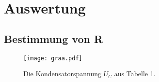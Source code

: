 \section{Auswertung}
\label{sec:Auswertung}

\subsection{Bestimmung von R}
\begin{figure}[H]
	\centering
	\caption{Die Kondensatorspannung $U_C$ aus Tabelle 1.}
	\texttt{[image: graa.pdf]}
	\label{fig:graa}
\end{figure}

